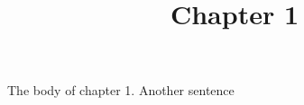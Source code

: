 \documentclass{article}
\begin{document}
\title{Chapter 1}

\maketitle


The body of chapter 1. Another sentence
\end{document}
